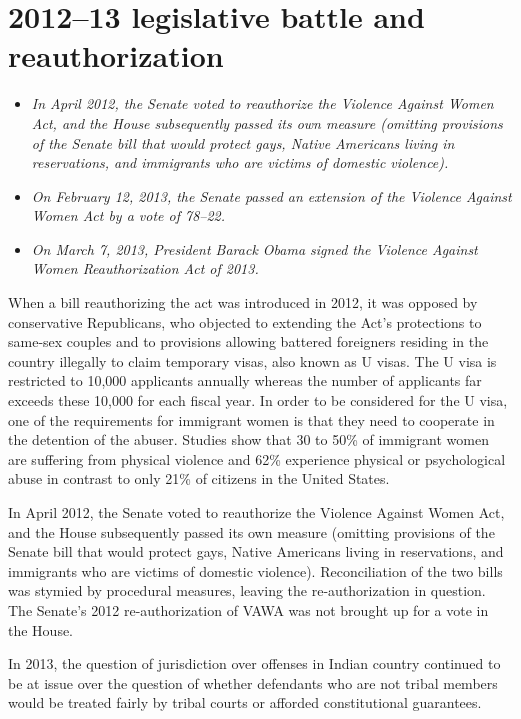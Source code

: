 \section{2012--13 legislative battle and
reauthorization}\label{legislative-battle-and-reauthorization}

\begin{itemize}
\item
  \emph{In April 2012, the Senate voted to reauthorize the Violence
  Against Women Act, and the House subsequently passed its own measure
  (omitting provisions of the Senate bill that would protect gays,
  Native Americans living in reservations, and immigrants who are
  victims of domestic violence).}
\item
  \emph{On February 12, 2013, the Senate passed an extension of the
  Violence Against Women Act by a vote of 78--22.}
\item
  \emph{On March 7, 2013, President Barack Obama signed the Violence
  Against Women Reauthorization Act of 2013.}
\end{itemize}

When a bill reauthorizing the act was introduced in 2012, it was opposed
by conservative Republicans, who objected to extending the Act's
protections to same-sex couples and to provisions allowing battered
foreigners residing in the country illegally to claim temporary visas,
also known as U visas. The U visa is restricted to 10,000 applicants
annually whereas the number of applicants far exceeds these 10,000 for
each fiscal year. In order to be considered for the U visa, one of the
requirements for immigrant women is that they need to cooperate in the
detention of the abuser. Studies show that 30 to 50\% of immigrant women
are suffering from physical violence and 62\% experience physical or
psychological abuse in contrast to only 21\% of citizens in the United
States.

In April 2012, the Senate voted to reauthorize the Violence Against
Women Act, and the House subsequently passed its own measure (omitting
provisions of the Senate bill that would protect gays, Native Americans
living in reservations, and immigrants who are victims of domestic
violence). Reconciliation of the two bills was stymied by procedural
measures, leaving the re-authorization in question. The Senate's 2012
re-authorization of VAWA was not brought up for a vote in the House.

In 2013, the question of jurisdiction over offenses in Indian country
continued to be at issue over the question of whether defendants who are
not tribal members would be treated fairly by tribal courts or afforded
constitutional guarantees.

